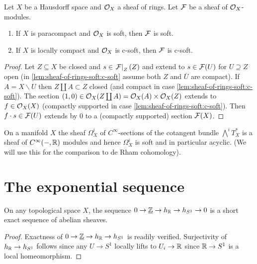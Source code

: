 \documentclass[../main.tex]{subfiles}
\begin{document}
\begin{lem}
    Let $X$ be a Hausdorff space and $\mathcal{O}_X$ a sheaf of rings. Let $\mathcal{F}$ be a sheaf of $\mathcal{O}_X$-modules.
    \begin{enumerate}
        \item\label{lem:sheaf-of-rings-soft:soft} If $X$ is paracompact and $\mathcal{O}_X$ is soft, then $\mathcal{F}$ is soft.
        \item\label{lem:sheaf-of-rings-soft:c-soft} If $X$ is locally compact and $\mathcal{O}_X$ is c-soft, then $\mathcal{F}$ is c-soft.
    \end{enumerate}
\end{lem}
\begin{proof}
    Let $Z\subseteq X$ be closed and $s\in \left.\mathcal{F}\right|_{Z}(Z)$ and extend to $s\in \mathcal{F}(U)$ for $U\supseteq Z$ open (in \cref{lem:sheaf-of-rings-soft:c-soft} assume both $Z$ and $\overline{U}$ are compact). If $A = X\backslash U$ then $Z \coprod A \subset Z$ closed (and compact in case \cref{lem:sheaf-of-rings-soft:c-soft}). The section $(1,0) \in \mathcal{O}_X(Z\coprod A) = \mathcal{O}_X(A)\times \mathcal{O}_X(Z)$ extends to $f\in \mathcal{O}_X(X)$ (compactly supported in case \cref{lem:sheaf-of-rings-soft:c-soft}). Then $f\cdot s \in \mathcal{F}(U)$ extends by $0$ to a (compactly supported) section $\mathcal{F}(X)$. 
\end{proof}

\begin{exmp}\label{exmp:manifold-Omega}
    On a manifold $X$ the sheaf $\Omega^i_X$ of $C^\infty$-sections of the cotangent bundle $\bigwedge^i T_X^*$ is a sheaf of $C^\infty(-, \mathbb{R})$ modules and hence $\Omega_X^i$ is soft and in particular acyclic. (We will use this for the comparison to de Rham cohomology).
\end{exmp}

\section{The exponential sequence}

\begin{lem}\label{lem:exponential-sequence}
On any topological space \(X\), the sequence $0\to \underline{\mathbb{Z}} \to h_{\mathbb{R}}\to h_{S^1} \to 0$ is a short exact sequence of abelian sheaves.
\end{lem}
\begin{proof}
Exactness of $0\to \underline{\mathbb{Z}}\to h_{\mathbb{R}}\to h_{S^1}$ is readily verified. Surjectivity of $h_{\mathbb{R}}\to h_{S^1}$ follows since any $U\to S^1$ locally lifts to $U_i\to \mathbb{R}$ since $\mathbb{R}\to S^1$ is a local homeomorphism.
\end{proof}
\end{document}
